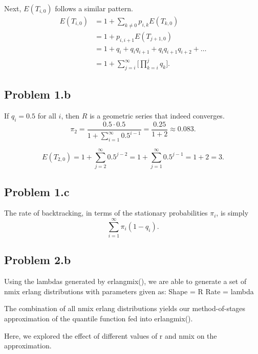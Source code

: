 \documentclass[letter]{article}
\begin{document}
Next, $E(T_{i,0})$ follows a similar pattern. 
\begin{equation*}
  \begin{aligned}
      E(T_{i,0}) &= 1 + \sum_{k \ne 0}{p_{i,k}E(T_{k,0})} \\ 
                 &= 1 + p_{i,i+1}E(T_{j+1,0}) \\
                 &= 1 + q_i + q_iq_{i+1} + q_iq_{i+1}q_{i+2} + \dots \\
                 &= 1 + \sum_{j=i}^\infty{\Big[ \prod_{k=i}^{j}{q_k} \Big]}.
  \end{aligned}
\end{equation*}


\subsection*{Problem 1.b}
If $q_i = 0.5$ for all $i$, then $R$ is a geometric series that indeed converges. 
$$ \pi_2 = \frac{0.5 \cdot 0.5}{1 + \sum_{i=1}^\infty{0.5^{i-1}}} = 
           \frac{0.25}{1+2} \approx 0.083. $$

$$ E(T_{2,0}) = 1 + \sum_{j=2}^\infty{0.5^{j-2}} 
              = 1 + \sum_{j=1}^\infty{0.5^{j-1}} = 1 + 2 = 3. $$

\subsection*{Problem 1.c}
The rate of backtracking, in terms of the stationary probabilities $\pi_i$, is simply
$$ \sum_{i=1}^\infty{\pi_i(1 - q_i)}. $$


\subsection*{Problem 2.b}

Using the lambdas generated by erlangmix(), we are able to generate a set of nmix erlang distributions with
parameters given as:
  Shape = R
  Rate = lambda
  
The combination of all nmix erlang distributions yields our method-of-stages approximation of the quantile function
fed into erlangmix().

Here, we explored the effect of different values of r and nmix on the approximation.
\end{document}
